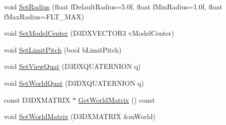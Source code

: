 \begin{DoxyCompactItemize}
\item 
void \hyperlink{class_c_model_viewer_camera_ae86762ee234412b6a0947b791d7be2d3}{SetRadius} (float fDefaultRadius=5.0f, float fMinRadius=1.0f, float fMaxRadius=FLT\_\-MAX)
\item 
void \hyperlink{class_c_model_viewer_camera_ae1511eb18ef5ec36904ba2f6819e26f2}{SetModelCenter} (D3DXVECTOR3 vModelCenter)
\item 
void \hyperlink{class_c_model_viewer_camera_adccbf68ed56b3d7204366dd8702912b4}{SetLimitPitch} (bool bLimitPitch)
\item 
void \hyperlink{class_c_model_viewer_camera_a66a842563bb9078bfa641bf6f1190818}{SetViewQuat} (D3DXQUATERNION q)
\item 
void \hyperlink{class_c_model_viewer_camera_a48515af5127c1647621df308171d72d4}{SetWorldQuat} (D3DXQUATERNION q)
\item 
const D3DXMATRIX $\ast$ \hyperlink{class_c_model_viewer_camera_adf18f000e0d304a5172424ad4151ddb6}{GetWorldMatrix} () const 
\item 
void \hyperlink{class_c_model_viewer_camera_ab5316accb7dfb3fd30a98f2647cedca0}{SetWorldMatrix} (D3DXMATRIX \&mWorld)
\end{DoxyCompactItemize}
